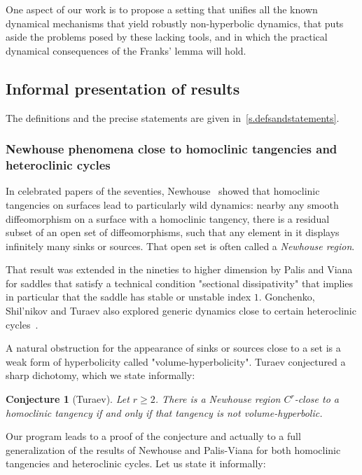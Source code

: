 \documentclass[11pt, a4paper]{amsart}
\theoremstyle{plain}
\newtheorem{conjecture}{Conjecture}[proposition]
\theoremstyle{definition}
\theoremstyle{remark}
\numberwithin{equation}{section}         %
\begin{document}
One aspect of our work is to propose a  setting that unifies all the known dynamical mechanisms that yield robustly non-hyperbolic dynamics,  that puts aside the problems posed by these lacking tools, and in which the practical dynamical consequences of the Franks' lemma will hold. 


 
\subsection{Informal presentation of results}
 The definitions and the precise statements are given in~\cref{s.defsandstatements}.

\subsubsection{Newhouse phenomena close to homoclinic tangencies and heteroclinic cycles}
In celebrated papers of the seventies, Newhouse~\cite{N1,N2} showed that homoclinic tangencies on surfaces lead to  particularly wild dynamics: 
nearby any smooth diffeomorphism on a surface with a homoclinic tangency, there is a residual subset of an open set of diffeomorphisms, such that any element in it displays infinitely many sinks or sources. That open set is often called a {\em Newhouse region}. 

That result was extended in the nineties to higher dimension by Palis and Viana~\cite{PV} for saddles that satisfy a technical condition "sectional dissipativity" that implies in particular that the saddle has stable or unstable index $1$. Gonchenko, Shil'nikov and Turaev also explored generic dynamics close to certain heteroclinic cycles~\cite{GST1,GST3}. 

A natural obstruction for the appearance of sinks or sources close to a set is a weak form of hyperbolicity called "volume-hyperbolicity". Turaev conjectured a sharp dichotomy, which we state informally:

\begin{conjecture}[Turaev]\label{c.turaev}
Let $r\geq 2$. There is a Newhouse region $C^r$-close to a homoclinic tangency if and only if that tangency is not volume-hyperbolic.
\end{conjecture}


Our program leads to a proof of the conjecture and actually to a full generalization of the results of Newhouse and Palis-Viana for both homoclinic tangencies and heteroclinic cycles.  Let us state it informally:
\medskip
\end{document}
